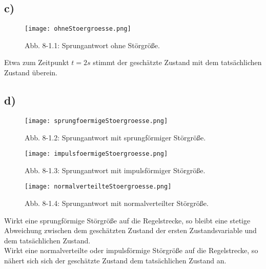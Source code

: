 \documentclass[11pt]{scrartcl} %
\begin{document}
\subsection*{c)}
\begin{figure}[H]
\centering
\texttt{[image: ohneStoergroesse.png]}
\captionsetup{labelformat=empty}
\caption{Abb. 8-1.1: Sprungantwort ohne Störgröße.}
\end{figure}
Etwa zum Zeitpunkt $t=2s$ stimmt der geschätzte Zustand mit dem tatsächlichen Zustand überein.

\subsection*{d)}
\begin{figure}[H]
\centering
\texttt{[image: sprungfoermigeStoergroesse.png]}
\captionsetup{labelformat=empty}
\caption{Abb. 8-1.2: Sprungantwort mit sprungförmiger Störgröße.}
\end{figure}

\begin{figure}[H]
\centering
\texttt{[image: impulsfoermigeStoergroesse.png]}
\captionsetup{labelformat=empty}
\caption{Abb. 8-1.3: Sprungantwort mit impulsförmiger Störgröße.}
\end{figure}

\begin{figure}[H]
\centering
\texttt{[image: normalverteilteStoergroesse.png]}
\captionsetup{labelformat=empty}
\caption{Abb. 8-1.4: Sprungantwort mit normalverteilter Störgröße.}
\end{figure}

Wirkt eine sprungförmige Störgröße auf die Regelstrecke, so bleibt eine stetige Abweichung zwischen dem geschätzten Zustand der ersten Zustandsvariable und dem tatsächlichen Zustand.\\
Wirkt eine normalverteilte oder impulsförmige Störgröße auf die Regelstrecke, so nähert sich sich der geschätzte Zustand dem tatsächlichen Zustand an.
\end{document}
